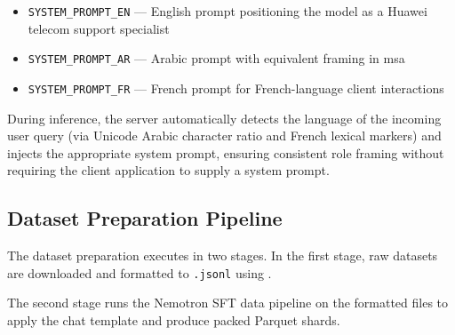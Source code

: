 \begin{itemize}
  \item \texttt{SYSTEM\_PROMPT\_EN} — English prompt positioning the
        model as a Huawei telecom support specialist
  \item \texttt{SYSTEM\_PROMPT\_AR} — Arabic prompt with equivalent
        framing in \acrshort{msa}
  \item \texttt{SYSTEM\_PROMPT\_FR} — French prompt for
        French-language client interactions
\end{itemize}

During inference, the server automatically detects the language of
the incoming user query (via Unicode Arabic character ratio and
French lexical markers) and injects the appropriate system prompt,
ensuring consistent role framing without requiring the client
application to supply a system prompt.

\subsection{Dataset Preparation Pipeline}
\label{sec:data-prep-pipeline}

The dataset preparation executes in two stages. In the first stage, raw
datasets are downloaded and formatted to \texttt{.jsonl} using
.

The second stage runs the Nemotron SFT data pipeline on the formatted
files to apply the chat template and produce packed Parquet shards.
